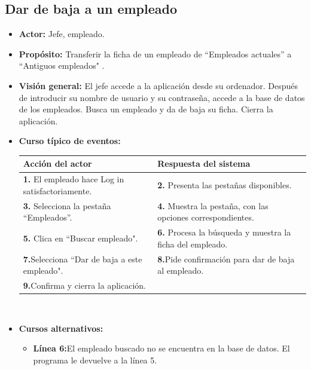 \documentclass[spanish,a4paper,11pt, twoside]{report}	%
\begin{document}

	\subsection{Dar de baja a un empleado}	
			\begin{itemize}
			\item \textbf{Actor:} Jefe, empleado.
			\item \textbf{Propósito:} Transferir la ficha de un empleado de “Empleados actuales” a “Antiguos empleados" .
			\item \textbf{Visión general:} El jefe accede a la aplicación desde su ordenador. Después de introducir su nombre de usuario y su contraseña, accede a la base de datos de los empleados. Busca un empleado y da de baja su ficha. Cierra la aplicación. 
			\item \textbf{Curso típico de eventos:} 	\\
				\begin{tabular}{|p{6cm}||p{6cm}|}
				\hline
				\textbf{Acción del actor} & \textbf{Respuesta del sistema} \\ \hline \hline
				\textbf{1.}   El empleado hace Log in satisfactoriamente. & \textbf{2.} Presenta las pestañas disponibles.\\ \hline
				\textbf{3.} Selecciona la pestaña “Empleados”. & \textbf{4.} Muestra la pestaña, con las opciones correspondientes. \\ \hline
				\textbf{5.} Clica en “Buscar empleado".	& \textbf{6.} Procesa la búsqueda y muestra la ficha del empleado. \\ \hline
				\textbf{7.}Selecciona “Dar de baja a este empleado". & \textbf{8.}Pide confirmación para dar de baja al empleado.\\ \hline
				\textbf{9.}Confirma y cierra la aplicación. & \textbf{} \\ \hline
			\end{tabular}
			\\
			\item \textbf{Cursos alternativos:} 
			\begin{itemize}
			\item  \textbf{Línea 6:}El empleado buscado no se encuentra en la base de datos. El programa le devuelve a la línea 5.
			\end {itemize}
		\end{itemize}%


\end{document}

